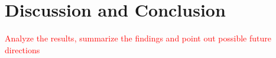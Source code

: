 \section{Discussion and Conclusion}
\textcolor{red}{
Analyze the results, summarize the findings and point out possible future directions
}